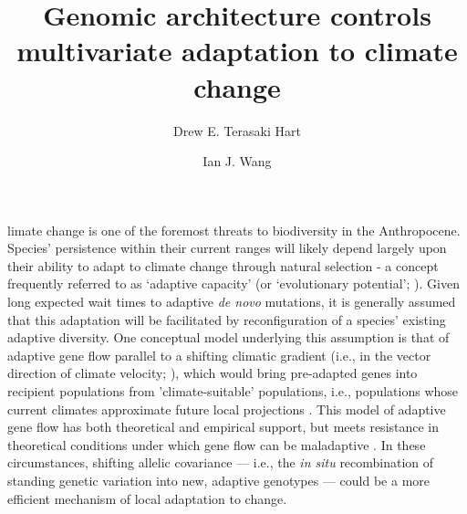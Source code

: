 \documentclass[9pt,twocolumn,twoside,lineno]{pnas-new}
\title{Genomic architecture controls multivariate adaptation to climate change}
\author[a,1]{Drew E. Terasaki Hart}
\author[a]{Ian J. Wang}
\affil[a]{Department of Environmental Science, Policy, and Management, University of California, Berkeley, CA 94720}
\begin{document}
\maketitle
\thispagestyle{firststyle}




limate change is one of the foremost threats to biodiversity in the Anthropocene.
Species’ persistence within their current ranges will likely depend largely upon their ability to
adapt to climate change through natural selection - a concept frequently referred to 
as `adaptive capacity’ (or `evolutionary potential’;
\cite{chevin,harrisson,nicotra,vilas,wade}).
Given long expected wait times to adaptive \textit{de novo} mutations,
it is generally assumed that this adaptation will be facilitated
by reconfiguration of a species' existing adaptive diversity.
One conceptual model underlying this assumption is that of
adaptive gene flow parallel to a shifting climatic gradient
(i.e., in the vector
direction of climate velocity; \cite{ackerly}),
which would bring pre-adapted genes into recipient populations
from 'climate-suitable' populations, i.e., populations whose
current climates approximate future local projections \cite{bellis}.
This model of adaptive gene flow has both theoretical
\cite{aitken_whitlock,slatkin,tigano}
and empirical 
\cite{feder,bell}
support,
but meets resistance in theoretical conditions under which gene flow can be maladaptive
\cite{wang,lenormand,slatkin,haldane,wright,felsenstein}.
In these circumstances, shifting allelic covariance --- 
i.e., the \textit{in situ} recombination of standing genetic variation into new,
adaptive genotypes --- could be a more efficient mechanism of local adaptation to change.
\end{document}
